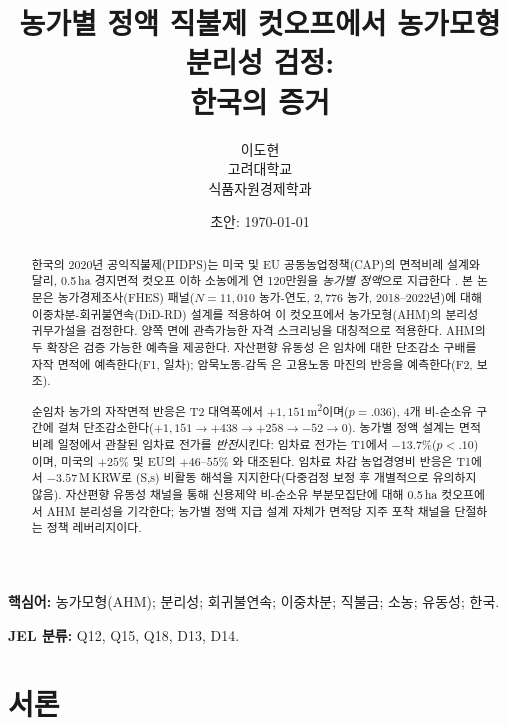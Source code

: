 \documentclass[12pt, a4paper]{article}
\title{농가별 정액 직불제 컷오프에서 농가모형 분리성 검정:\\
       한국의 증거}
\author{이도현\\
        고려대학교\\
        식품자원경제학과}
\date{초안: \today}
\begin{document}
\maketitle

\begin{abstract}
\noindent
한국의 2020년 공익직불제(PIDPS)는 미국 및 EU 공동농업정책(CAP)의 면적비례 설계와 달리, 0.5\,ha 경지면적 컷오프 이하 소농에게 연 120만원을 \emph{농가별 정액}으로 지급한다 \citep{Kirwan2009_rentcap, BaldoniCiaian2023_eucap}. 본 논문은 농가경제조사(FHES) 패널($N = 11{,}010$ 농가-연도, $2{,}776$ 농가, 2018--2022년)에 대해 이중차분-회귀불연속(DiD-RD) 설계를 적용하여 이 컷오프에서 농가모형(AHM)의 분리성 귀무가설을 검정한다. 양쪽 면에 관측가능한 자격 스크리닝을 대칭적으로 적용한다. AHM의 두 확장은 검증 가능한 예측을 제공한다. 자산편향 유동성 \citep{CarterOlinto2003_liquidity}은 임차에 대한 단조감소 구배를 자작 면적에 예측한다(F1, 일차); 암묵노동-감독 \citep{EswaranKotwal1986_supervision}은 고용노동 마진의 반응을 예측한다(F2, 보조).

순임차 농가의 자작면적 반응은 T2 대역폭에서 $+1{,}151$\,m\textsuperscript{2}이며($p = .036$), 4개 비-순소유 구간에 걸쳐 단조감소한다($+1{,}151 \to +438 \to +258 \to -52 \to 0$). 농가별 정액 설계는 면적비례 일정에서 관찰된 임차료 전가를 \emph{반전}시킨다: 임차료 전가는 T1에서 $-13.7\%$($p < .10$)이며, 미국의 $+25\%$ \citep{Kirwan2009_rentcap} 및 EU의 $+46$--$55\%$ \citep{BaldoniCiaian2023_eucap}와 대조된다. 임차료 차감 농업경영비 반응은 T1에서 $-3.57$\,M\,KRW로 (S,s) 비활동 해석을 지지한다(다중검정 보정 후 개별적으로 유의하지 않음). 자산편향 유동성 채널을 통해 신용제약 비-순소유 부분모집단에 대해 0.5\,ha 컷오프에서 AHM 분리성을 기각한다; 농가별 정액 지급 설계 자체가 면적당 지주 포착 채널을 단절하는 정책 레버리지이다.
\end{abstract}

\noindent\textbf{핵심어:} 농가모형(AHM); 분리성; 회귀불연속; 이중차분; 직불금; 소농; 유동성; 한국.

\noindent\textbf{JEL 분류:} Q12, Q15, Q18, D13, D14.

\bigskip

\section{서론}
\label{sec:intro}
\end{document}

